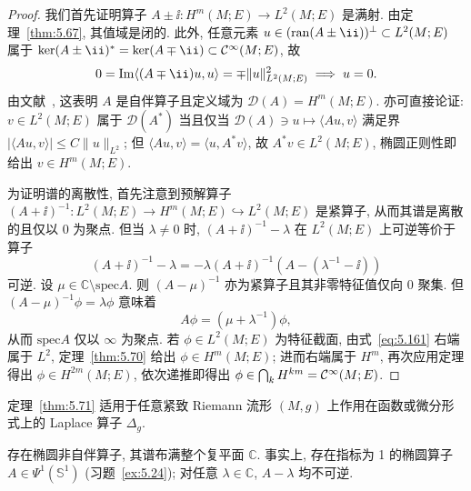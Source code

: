 \begin{proof}
我们首先证明算子 $A \pm \ii \colon H^m(M; E) \to L^2(M; E)$ 是满射. 由定理~\ref{thm:5.67}, 其值域是闭的. 此外, 任意元素 $u \in (\ran(A \pm \ii))^\perp \subset L^2(M; E)$ 属于 $\ker(A \pm \ii)^* = \ker(A \mp \ii) \subset \Smooth(M; E)$, 故
\begin{equation}\label{eq:5.159}
    0 = \Imag \langle (A \mp \ii) u, u \rangle = \mp \|u\|_{L^2(M; E)}^2 \implies u = 0.
\end{equation}
由文献~\cite[定理 VIII.3]{RS72}, 这表明 $A$ 是自伴算子且定义域为 $\mathcal{D}(A) = H^m(M; E)$. 亦可直接论证: $v \in L^2(M; E)$ 属于 $\mathcal{D}(A^*)$ 当且仅当 $\mathcal{D}(A) \ni u \mapsto \langle A u, v \rangle$ 满足界 $|\langle A u, v \rangle| \le C \|u\|_{L^2}$; 但 $\langle A u, v \rangle = \langle u, A^* v \rangle$, 故 $A^* v \in L^2(M; E)$, 椭圆正则性即给出 $v \in H^m(M; E)$.

为证明谱的离散性, 首先注意到预解算子 $(A + \ii)^{-1} \colon L^2(M; E) \to H^m(M; E) \hookrightarrow L^2(M; E)$ 是紧算子, 从而其谱是离散的且仅以 0 为聚点. 但当 $\lambda \neq 0$ 时, $(A + \ii)^{-1} - \lambda$ 在 $L^2(M; E)$ 上可逆等价于算子
\begin{equation}\label{eq:5.160}
    (A + \ii)^{-1} - \lambda = -\lambda (A + \ii)^{-1} \left( A - (\lambda^{-1} - \ii) \right)
\end{equation}
可逆. 设 $\mu \in \mathbb{C} \setminus \mathrm{spec} A$. 则 $(A - \mu)^{-1}$ 亦为紧算子且其非零特征值仅向 0 聚集. 但 $(A - \mu)^{-1} \phi = \lambda \phi$ 意味着
\begin{equation}\label{eq:5.161}
    A \phi = (\mu + \lambda^{-1}) \phi,
\end{equation}
从而 $\mathrm{spec} A$ 仅以 $\infty$ 为聚点. 若 $\phi \in L^2(M; E)$ 为特征截面, 由式~\eqref{eq:5.161} 右端属于 $L^2$, 定理~\ref{thm:5.70} 给出 $\phi \in H^m(M; E)$; 进而右端属于 $H^m$, 再次应用定理得出 $\phi \in H^{2m}(M; E)$, 依次递推即得出 $\phi \in \bigcap_k H^{km} = \mathcal{C}^\infty(M; E)$.
\end{proof}

\begin{example}[Laplace 算子]\label{eg:5.72}
定理~\ref{thm:5.71} 适用于任意紧致 Riemann 流形 $(M, g)$ 上作用在函数或微分形式上的 Laplace 算子 $\Delta_g$.
\end{example}

\begin{example}[非自伴情形]\label{eg:5.73}
存在椭圆非自伴算子, 其谱布满整个复平面 $\mathbb{C}$. 事实上, 存在指标为 1 的椭圆算子 $A \in \Psi^1(\mathbb{S}^1)$ (习题~\ref{ex:5.24}); 对任意 $\lambda \in \mathbb{C}$, $A - \lambda$ 均不可逆.
\end{example}

